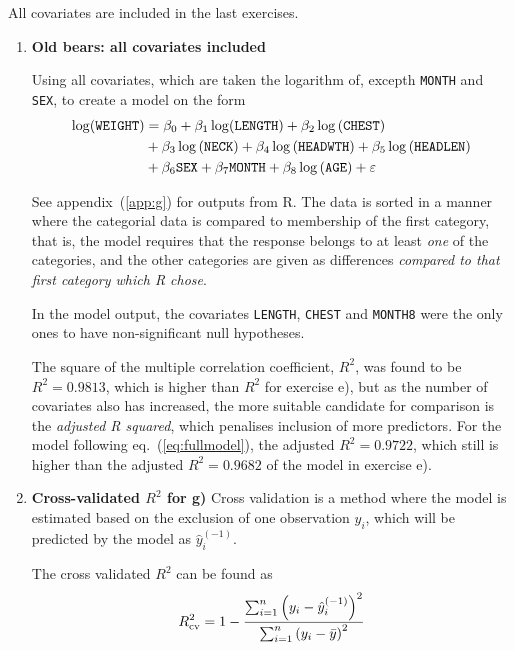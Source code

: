 \documentclass[a4paper,11pt]{article}
\begin{document}
All covariates are included in the last exercises.

\begin{enumerate}[resume*]
    \item \textbf{Old bears: all covariates included}

        Using all covariates, which are taken the logarithm of, excepth \texttt{MONTH} and \texttt{SEX}, to create a model on the form
\begin{align}
    \log(\mathtt{WEIGHT}) &= \beta_0 + \beta_1 \log(\mathtt{LENGTH}) + \beta_2 \log\left( \mathtt{CHEST} \right) \notag \\
    &+ \beta_3 \log \left( \mathtt{NECK} \right) + \beta_4 \log\left( \mathtt{HEADWTH} \right) + \beta_5 \log \left( \mathtt{HEADLEN} \right) \notag \\
    &+ \beta_6 \mathtt{SEX} + \beta_7 \mathtt{MONTH} + \beta_8 \log \left( \mathtt{AGE} \right) + \varepsilon
    \label{eq:fullmodel}
\end{align}

See appendix~(\ref{app:g}) for outputs from R. The data is sorted in a manner where the categorial data is compared to membership of the first category, that is, the model requires that the response belongs to at least \textit{one} of the categories, and the other categories are given as differences \textit{compared to that first category which R chose}. 

In the model output, the covariates \texttt{LENGTH}, \texttt{CHEST} and \texttt{MONTH8} were the only ones to have non-significant null hypotheses. 

The square of the multiple  correlation coefficient, $R^2$, was found to be $R^2 = 0.9813$, which is higher than $R^2$ for exercise e), but as the number of covariates also has increased, the more suitable candidate for comparison is the \textit{adjusted R squared}, which penalises inclusion of more predictors. For the model following eq.~(\ref{eq:fullmodel}), the adjusted $R^2 = 0.9722$, which still is higher than the adjusted $R^2 = 0.9682$ of the model in exercise e). 

    \item \textbf{Cross-validated $R^2$ for g)}
        Cross validation is a method where the model is estimated based on the exclusion of one observation $y_i$, which will be predicted by the model as $\hat{y}_i^{(-1)}$. 

        The cross validated $R^2$ can be found as
        \begin{equation}
            R_{\rm cv}^2 = 1 - \frac{\sum_{i=1}^n \left( y_i - \hat{y}^{(-1)}_i \right)^2}{ \sum_{i=1}^n \left( y_i - \bar{y} \right)^2}
            \label{eq:rsquared_crossval}
        \end{equation}


\end{enumerate}
\end{document}
